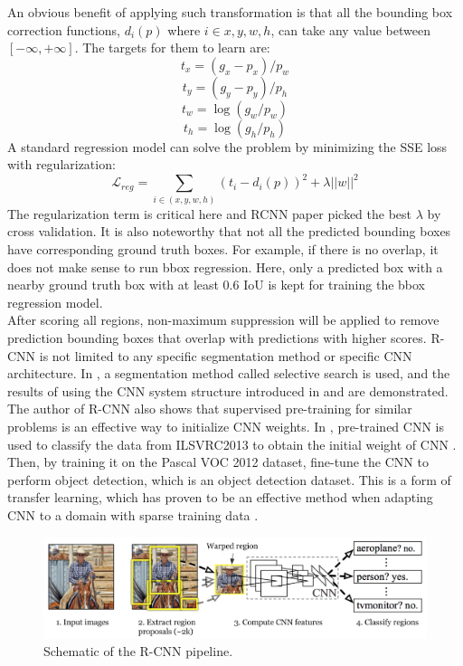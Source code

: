 An obvious benefit of applying such transformation is that all the bounding box correction functions, \(d_i (p)\) where \( i\in {x,y,w,h}\), can take any value between \([-\infty,+\infty]\). The targets for them to learn are:
\begin{equation}
	t_x=(g_x-p_x )/p_w
\end{equation}
\begin{equation}
	t_y=(g_y-p_y )/p_h
\end{equation}
\begin{equation}
	t_w=\log{(g_w/p_w)} 
\end{equation}
\begin{equation}
	t_h=\log{(g_h/p_h)} 
\end{equation}
A standard regression model can solve the problem by minimizing the SSE loss with regularization:
\begin{equation}
	\mathcal{L}_{reg} = \sum_{i \in (x,y,w,h)}(t_i-d_i(p))^2 + \lambda||w||^2
\end{equation}
The regularization term is critical here and RCNN paper picked the best \(\lambda\) by cross validation. It is also noteworthy that not all the predicted bounding boxes have corresponding ground truth boxes. For example, if there is no overlap, it does not make sense to run bbox regression. Here, only a predicted box with a nearby ground truth box with at least 0.6 IoU is kept for training the bbox regression model.
\\After scoring all regions, non-maximum suppression will be applied to remove prediction bounding boxes that overlap with predictions with higher scores. R-CNN is not limited to any specific segmentation method or specific CNN architecture. In \cite{DBLP:journals/corr/GirshickDDM13}, a segmentation method called selective search \cite{6126456} is used, and the results of using the CNN system structure introduced in \cite{10.1145/3065386} and \cite{Simonyan2015VeryDC} are demonstrated.
\\The author of R-CNN also shows that supervised pre-training for similar problems is an effective way to initialize CNN weights. In \cite{DBLP:journals/corr/GirshickDDM13}, pre-trained CNN is used to classify the data from ILSVRC2013 to obtain the initial weight of CNN \cite{DBLP:journals/corr/RussakovskyDSKSMHKKBBF14}. Then, by training it on the Pascal VOC 2012 dataset, fine-tune the CNN to perform object detection, which is an object detection dataset. This is a form of transfer learning, which has proven to be an effective method when adapting CNN to a domain with sparse training data \cite{DBLP:journals/corr/abs-1808-01974}.
\begin{figure}
	\centerline{\includegraphics[width=1\linewidth]{Figs/rcnnSche.png}}
	\caption{Schematic of the R-CNN pipeline.}
	\label{fig:rcnnSche}
\end{figure}
